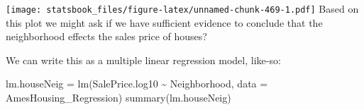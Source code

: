 \documentclass[
]{book}
\newenvironment{Shaded}{\begin{snugshade}}{\end{snugshade}}
\newcommand{\AttributeTok}[1]{\textcolor[rgb]{0.77,0.63,0.00}{#1}}
\newcommand{\DecValTok}[1]{\textcolor[rgb]{0.00,0.00,0.81}{#1}}
\newcommand{\FloatTok}[1]{\textcolor[rgb]{0.00,0.00,0.81}{#1}}
\newcommand{\FunctionTok}[1]{\textcolor[rgb]{0.00,0.00,0.00}{#1}}
\newcommand{\NormalTok}[1]{#1}
\newcommand{\OtherTok}[1]{\textcolor[rgb]{0.56,0.35,0.01}{#1}}
\newcommand{\SpecialCharTok}[1]{\textcolor[rgb]{0.00,0.00,0.00}{#1}}
\newcommand{\StringTok}[1]{\textcolor[rgb]{0.31,0.60,0.02}{#1}}
\theoremstyle{definition}
\theoremstyle{definition}
\theoremstyle{definition}
\theoremstyle{definition}
\theoremstyle{remark}
\begin{document}
\begin{Shaded}
\end{Shaded}

\texttt{[image: statsbook\_files/figure-latex/unnamed-chunk-469-1.pdf]}
Based on this plot we might ask if we have sufficient evidence to conclude that the neighborhood effects the sales price of houses?

We can write this as a multiple linear regression model, like-so:

\begin{Shaded}
\begin{Highlighting}[]
\NormalTok{lm.houseNeig }\OtherTok{=} \FunctionTok{lm}\NormalTok{(SalePrice.log10 }\SpecialCharTok{\textasciitilde{}}\NormalTok{ Neighborhood, }\AttributeTok{data =}\NormalTok{ AmesHousing\_Regression)}
\FunctionTok{summary}\NormalTok{(lm.houseNeig)}
\end{Highlighting}
\end{Shaded}
\end{document}
